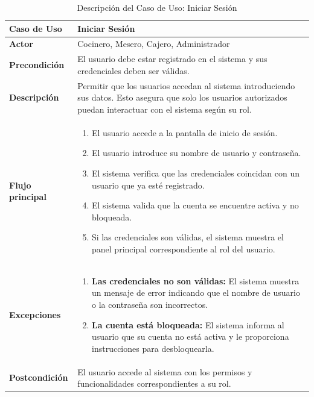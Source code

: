 \documentclass{article}
\begin{document}
\begin{table}[H]
    \centering
    \begin{tabular}{|l|p{12cm}|}
    \hline
    \textbf{Caso de Uso} & \textbf{Iniciar Sesión} \\ \hline
    \textbf{Actor} & Cocinero, Mesero, Cajero, Administrador \\ \hline
    \textbf{Precondición} & El usuario debe estar registrado en el sistema y sus credenciales deben ser válidas. \\ \hline
    \textbf{Descripción} & Permitir que los usuarios accedan al sistema introduciendo sus datos. Esto asegura que solo los usuarios autorizados puedan interactuar con el sistema según su rol. \\ \hline
    \textbf{Flujo principal} & 
    \begin{enumerate}
        \item El usuario accede a la pantalla de inicio de sesión.
        \item El usuario introduce su nombre de usuario y contraseña.
        \item El sistema verifica que las credenciales coincidan con un usuario que ya esté registrado.
        \item El sistema valida que la cuenta se encuentre activa y no bloqueada.
        \item Si las credenciales son válidas, el sistema muestra el panel principal correspondiente al rol del usuario.
    \end{enumerate} \\ \hline
    \textbf{Excepciones} & 
    \begin{enumerate}
        \item \textbf{Las credenciales no son válidas:} El sistema muestra un mensaje de error indicando que el nombre de usuario o la contraseña son incorrectos.
        \item \textbf{La cuenta está bloqueada:} El sistema informa al usuario que su cuenta no está activa y le proporciona instrucciones para desbloquearla.
    \end{enumerate} \\ \hline
    \textbf{Postcondición} & El usuario accede al sistema con los permisos y funcionalidades correspondientes a su rol. \\ \hline
    \end{tabular}
    \caption{Descripción del Caso de Uso: Iniciar Sesión}
    \label{tab:caso_uso_iniciar_sesion}
\end{table}
    
\end{document}
